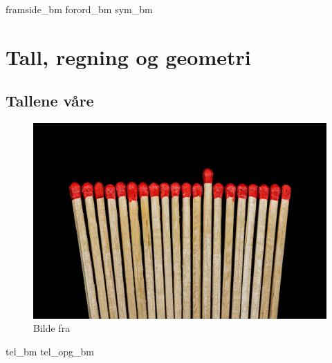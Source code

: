 



\renewcommand*\familydefault{\sfdefault} %

\addto\captionsenglish{\renewcommand{\figurename}{Figur}}
\makeatletter
\addto\captionsenglish{\renewcommand{\chaptername}{Kapittel}}
\addto\captionsenglish{\renewcommand{\partname}{Del}}
\addto\captionsenglish{\renewcommand{\contentsname}{Innhold}}


	

{framside_bm}
{forord_bm}
{sym_bm}
\newpage

{\footnotesize \tableofcontents}
\newpage
\part{Tall, regning og geometri}

\chapter{Tallene våre \label{Talavare}}
\begin{figure}
	\centering
	\includegraphics[scale=0.25]{sticks} \\
	{\footnotesize Bilde fra } 
\end{figure}
\newpage
{tel_bm}
{tel_opg_bm}

